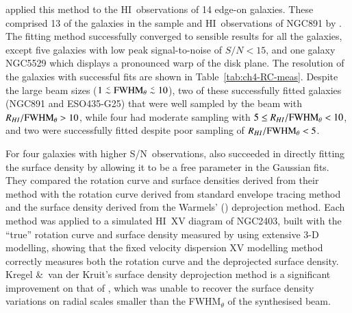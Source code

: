 \documentclass[traditabstract]{aa} %
\newcommand\lesim{\lower.5ex\hbox{$\; \buildrel < \over \sim \;$}}
\newcommand\HI{H{\small I}}
\newcommand\sn{S/N}
\begin{document}
\citet{kvdk2004} applied this method to the \HI\ observations of 14
edge-on galaxies. These comprised 13 of the galaxies in the
\citet{kvdkdb2004} sample and \HI\ observations of NGC891 by
\citet{ssvdh1997}. The fitting method successfully converged to
sensible results for all the galaxies, except five galaxies with low
peak signal-to-noise of $\sn < 15$, and one galaxy NGC5529 which
displays a pronounced warp of the disk plane. The resolution of the
galaxies with successful fits are shown in
Table~\ref{tab:ch4-RC-meas}. Despite the large beam sizes ($1 \lesim
{\rm FWHM}_{\theta} \lesim 10$), two of these successfully fitted galaxies
(NGC891 and ESO435-G25) that were well sampled by the beam with
$R_{HI}/{\rm FWHM}_{\theta} > 10$, while four had moderate sampling with $5
\leq R_{\HI}/{\rm FWHM}_{\theta} < 10$, and two were successfully fitted
despite poor sampling of $R_{HI}/{\rm FWHM}_{\theta} < 5$.


For four galaxies with higher \sn\ observations, \citet{kvdk2004}
also succeeded in directly fitting the surface density by allowing it
to be a free parameter in the Gaussian fits. They compared
the rotation curve and surface densities derived from their method with
the rotation curve derived from standard envelope tracing method and
the surface density derived from the Warmels' (\citeyear{warmels1988})
deprojection method. Each method was applied to a simulated \HI\ XV
diagram of NGC2403, built with the ``true'' rotation curve and surface
density measured by \citet{fvmso2002} using extensive 3-D modelling,
showing that the fixed velocity dispersion XV modelling method
correctly measures both the rotation curve and the deprojected surface
density. Kregel \&\ van der Kruit's surface density deprojection 
method is a significant
improvement on that of  \citep{warmels1988}, which was
unable to recover the surface density variations on radial scales
smaller than the FWHM$_{\theta}$ of the synthesised beam.
\end{document}
